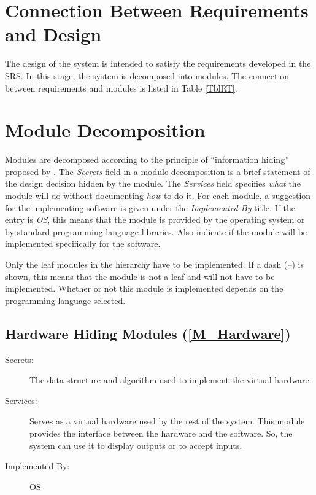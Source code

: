 \documentclass[12pt, titlepage]{article}
\begin{document}
\section{Connection Between Requirements and Design} \label{SecConnection}

The design of the system is intended to satisfy the requirements developed in
the SRS. In this stage, the system is decomposed into modules. The connection
between requirements and modules is listed in Table \ref{TblRT}.

\section{Module Decomposition} \label{SecMD}

Modules are decomposed according to the principle of ``information hiding''
proposed by \cite{ParnasEtAl1984}. The \emph{Secrets} field in a module
decomposition is a brief statement of the design decision hidden by the
module. The \emph{Services} field specifies \emph{what} the module will do
without documenting \emph{how} to do it. For each module, a suggestion for the
implementing software is given under the \emph{Implemented By} title. If the
entry is \emph{OS}, this means that the module is provided by the operating
system or by standard programming language libraries.  Also indicate if the
module will be implemented specifically for the software.

Only the leaf modules in the
hierarchy have to be implemented. If a dash (\emph{--}) is shown, this means
that the module is not a leaf and will not have to be implemented. Whether or
not this module is implemented depends on the programming language
selected.

\subsection{Hardware Hiding Modules (\texorpdfstring{\cref{M_Hardware}}))}
\label{MG_Hardware}
\begin{description}
\item[Secrets:]The data structure and algorithm used to implement the virtual 
hardware.
\item[Services:]Serves as a virtual hardware used by the rest of the system. 
This module provides the interface between the hardware and the software. So, 
the system can use it to display outputs or to accept inputs.
\item[Implemented By:] OS
\end{description}
\end{document}
